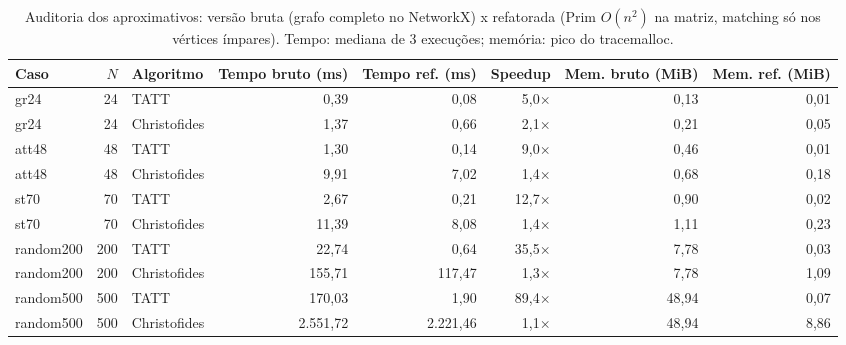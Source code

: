 \begin{table}[htb]
\centering
\caption{Auditoria dos aproximativos: versão bruta (grafo completo no NetworkX) x refatorada (Prim $O(n^2)$ na matriz, matching só nos vértices ímpares). Tempo: mediana de 3 execuções; memória: pico do tracemalloc.}
\label{tab:auditoria_aprox}
\small
\begin{adjustbox}{max width=\linewidth}
\begin{tabular}{lrlrrrrr}
\toprule
Caso & $N$ & Algoritmo & Tempo bruto (ms) & Tempo ref. (ms) & Speedup & Mem. bruto (MiB) & Mem. ref. (MiB) \\
\midrule
gr24 & 24 & TATT & 0{,}39 & 0{,}08 & 5{,}0$\times$ & 0{,}13 & 0{,}01 \\
gr24 & 24 & Christofides & 1{,}37 & 0{,}66 & 2{,}1$\times$ & 0{,}21 & 0{,}05 \\
att48 & 48 & TATT & 1{,}30 & 0{,}14 & 9{,}0$\times$ & 0{,}46 & 0{,}01 \\
att48 & 48 & Christofides & 9{,}91 & 7{,}02 & 1{,}4$\times$ & 0{,}68 & 0{,}18 \\
st70 & 70 & TATT & 2{,}67 & 0{,}21 & 12{,}7$\times$ & 0{,}90 & 0{,}02 \\
st70 & 70 & Christofides & 11{,}39 & 8{,}08 & 1{,}4$\times$ & 1{,}11 & 0{,}23 \\
random200 & 200 & TATT & 22{,}74 & 0{,}64 & 35{,}5$\times$ & 7{,}78 & 0{,}03 \\
random200 & 200 & Christofides & 155{,}71 & 117{,}47 & 1{,}3$\times$ & 7{,}78 & 1{,}09 \\
random500 & 500 & TATT & 170{,}03 & 1{,}90 & 89{,}4$\times$ & 48{,}94 & 0{,}07 \\
random500 & 500 & Christofides & 2.551{,}72 & 2.221{,}46 & 1{,}1$\times$ & 48{,}94 & 8{,}86 \\
\bottomrule
\end{tabular}
\end{adjustbox}
\end{table}
